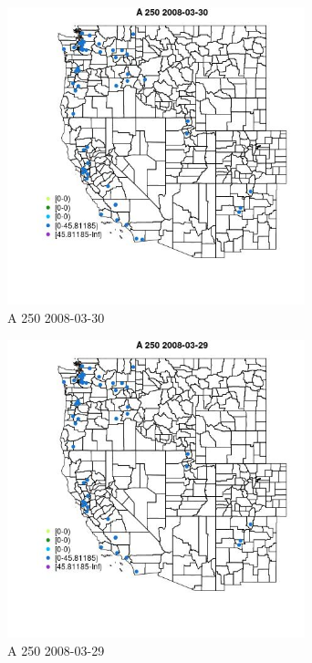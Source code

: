 \begin{figure} 
\centering  
\includegraphics[width=0.77\textwidth]{Code_Outputs/Report_ML_input_PM25_Step4_part_e_de_duplicated_aves_MapObsA_2502008-03-30.jpg} 
\caption{\label{fig:Report_ML_input_PM25_Step4_part_e_de_duplicated_avesMapObsA_2502008-03-30}A 250 2008-03-30} 
\end{figure} 
 

\clearpage 

\begin{figure} 
\centering  
\includegraphics[width=0.77\textwidth]{Code_Outputs/Report_ML_input_PM25_Step4_part_e_de_duplicated_aves_MapObsA_2502008-03-29.jpg} 
\caption{\label{fig:Report_ML_input_PM25_Step4_part_e_de_duplicated_avesMapObsA_2502008-03-29}A 250 2008-03-29} 
\end{figure} 
 

